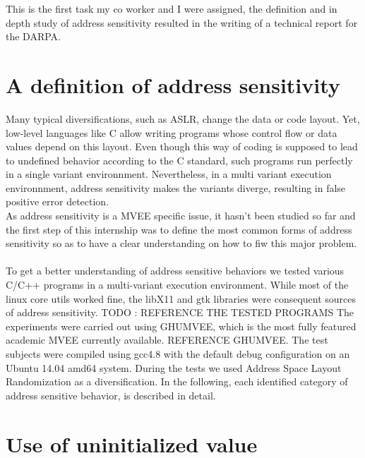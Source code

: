 \documentclass[english]{enstaPRE}
\begin{document}
This is the first task my co worker and I were assigned, the definition and in depth study of address sensitivity resulted in the
writing of a technical report for the DARPA. 

\section{A definition of address sensitivity}

Many typical diversifications, such as ASLR, change the data or code layout. Yet, low-level languages like C allow writing programs whose
control flow or data values depend on this layout. Even though this way of coding is supposed to lead to undefined behavior according to the C standard, 
such programs run perfectly in a single variant environnment. Nevertheless, in a multi variant execution environnment, address sensitivity makes the variants
diverge, resulting in false positive error detection. \\
As address sensitivity is a MVEE specific issue, it hasn't been studied so far and the first step of this internship was to define the most common forms of address
sensitivity so as to have a clear understanding on how to fiw this major problem. \\ \\
To get a better understanding of address sensitive behaviors we tested various C/C++
programs in a multi-variant execution environment. While most of the linux core utils
worked fine, the libX11 and gtk libraries were consequent sources of address sensitivity.
TODO : REFERENCE THE TESTED PROGRAMS
The experiments were carried out using GHUMVEE, which is the most fully featured academic MVEE currently available. REFERENCE GHUMVEE.
The test subjects were compiled using gcc4.8
with the default debug configuration on an Ubuntu 14.04 amd64 system. During the tests we used Address Space Layout Randomization as a diversification.
In the following, each identified category of address sensitive behavior, is described in detail.


\section{Use of uninitialized value} \label{uninit}
\end{document}
